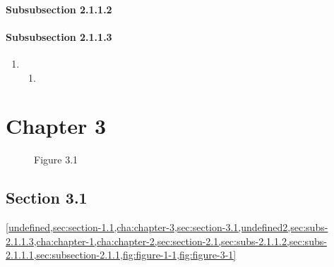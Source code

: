 \documentclass{book}
\begin{document}

\subsubsection{Subsubsection 2.1.1.2}
\label{sec:subs-2.1.1.2}

\subsubsection{Subsubsection 2.1.1.3}
\label{sec:subs-2.1.1.3}

\begin{enumerate}
\item {}
  \begin{enumerate}
  \item {}
  \end{enumerate}
\end{enumerate}

\chapter{Chapter 3}
\label{cha:chapter-3}



\begin{figure}
  \centering

  \caption{Figure 3.1}
  \label{fig:figure-3-1}
\end{figure}

\clearpage{}

\section{Section 3.1}
\label{sec:section-3.1}



\cref{undefined,sec:section-1.1,cha:chapter-3,sec:section-3.1,undefined2,sec:subs-2.1.1.3,cha:chapter-1,cha:chapter-2,sec:section-2.1,sec:subs-2.1.1.2,sec:subs-2.1.1.1,sec:subsection-2.1.1,fig:figure-1-1,fig:figure-3-1}
\end{document}
